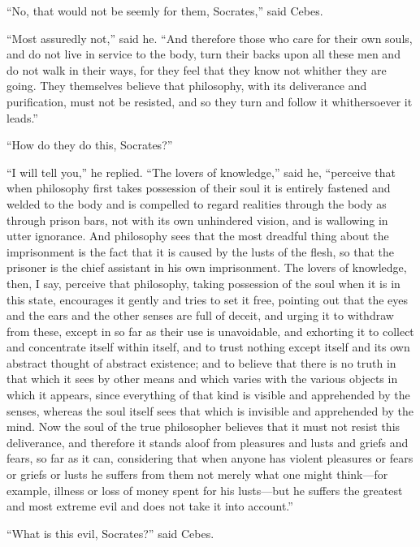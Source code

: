 \documentclass[letterpaper,12pt]{article}
\newcommand{\stephpag}[1]{\marginnote{\small\itshape\fontfamily{ppl}\selectfont #1}}
\begin{document}
\begin{drama}
``No, that would not be seemly for them, Socrates,'' said Cebes.
 
``Most assuredly not,'' \stephpag{d} said he. ``And therefore those who care for their own souls, and do not live in service to the body, turn their backs upon all these men and do not walk in their ways, for they feel that they know not whither they are going. They themselves believe that philosophy, with its deliverance and purification, must not be resisted, and so they turn and follow it whithersoever it leads.''
 
``How do they do this, Socrates?''
 
``I will tell you,'' he replied. ``The lovers of knowledge,'' said he, ``perceive that when philosophy first takes possession of their soul it is entirely \stephpag{e} fastened and welded to the body and is compelled to regard realities through the body as through prison bars, not with its own unhindered vision, and is wallowing in utter ignorance. And philosophy sees that the most dreadful thing about the imprisonment is the fact that it is caused by the lusts of the flesh, so that the prisoner is the \stephpag{83 a} chief assistant in his own imprisonment. The lovers of knowledge, then, I say, perceive that philosophy, taking possession of the soul when it is in this state, encourages it gently and tries to set it free, pointing out that the eyes and the ears and the other senses are full of deceit, and urging it to withdraw from these, except in so far as their use is unavoidable, and exhorting it to collect and concentrate itself within itself, and to trust nothing except \stephpag{b} itself and its own abstract thought of abstract existence; and to believe that there is no truth in that which it sees by other means and which varies with the various objects in which it appears, since everything of that kind is visible and apprehended by the senses, whereas the soul itself sees that which is invisible and apprehended by the mind. Now the soul of the true philosopher believes that it must not resist this deliverance, and therefore it stands aloof from pleasures and lusts and griefs and fears, so far as it can, considering that when anyone has violent pleasures or fears or griefs or lusts he suffers from them not merely what one might think---for example, illness or loss of money spent \stephpag{c} for his lusts---but he suffers the greatest and most extreme evil and does not take it into account.''
 
``What is this evil, Socrates?'' said Cebes.
 

\end{drama}
\end{document}
